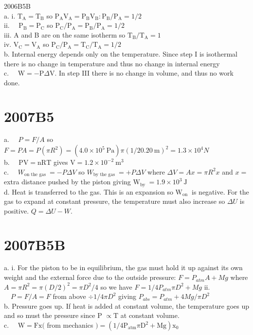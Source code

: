 \begin{enumerate}
2006B5B\\
a. i. $\mathrm{T}_{\mathrm{A}}=\mathrm{T}_{\mathrm{B}}$ so $\mathrm{P}_{\mathrm{A}} \mathrm{V}_{\mathrm{A}}=\mathrm{P}_{\mathrm{B}} \mathrm{V}_{\mathrm{B}}: \mathrm{P}_{\mathrm{B}} / \mathrm{P}_{\mathrm{A}}=1 / 2$\\
ii. $\quad \mathrm{P}_{\mathrm{B}}=\mathrm{P}_{\mathrm{C}}$ so $\mathrm{P}_{\mathrm{C}} / \mathrm{P}_{\mathrm{A}}=\mathrm{P}_{\mathrm{B}} / \mathrm{P}_{\mathrm{A}}=1 / 2$\\
iii. A and B are on the same isotherm so $\mathrm{T}_{\mathrm{B}} / \mathrm{T}_{\mathrm{A}}=1$\\
iv. $\mathrm{V}_{\mathrm{C}}=\mathrm{V}_{\mathrm{A}}$ so $\mathrm{P}_{\mathrm{C}} / \mathrm{P}_{\mathrm{A}}=\mathrm{T}_{\mathrm{C}} / \mathrm{T}_{\mathrm{A}}=1 / 2$\\
b. Internal energy depends only on the temperature. Since step I is isothermal there is no change in temperature and thus no change in internal energy\\
c. $\quad \mathrm{W}=-\mathrm{P} \Delta \mathrm{V}$. In step III there is no change in volume, and thus no work done.

\section*{2007B5}
a. $\quad P=F / A$ so $F=P A=P\left(\pi R^{2}\right)=\left(4.0 \times 10^{5} \mathrm{~Pa}\right) \pi(1 / 20.20 \mathrm{~m})^{2}=1.3 \times 10^{4} N$\\
b. $\quad \mathrm{PV}=\mathrm{nRT}$ gives $\mathrm{V}=1.2 \times 10^{-2} \mathrm{~m}^{3}$\\
c. $\quad W_{\text {on the gas }}=-P \Delta V$ so $W_{\text {by the gas }}=+P \Delta V$ where $\Delta V=A x=\pi R^{2} x$ and $x=$ extra distance pushed by the piston giving $\mathrm{W}_{\text {by }}=1.9 \times 10^{3} \mathrm{~J}$\\
d. Heat is transferred to the gas. This is an expansion so $\mathrm{W}_{\text {on }}$ is negative. For the gas to expand at constant pressure, the temperature must also increase so $\Delta U$ is positive. $Q=\Delta U-W$.

\section*{2007B5B}
a. i. For the piston to be in equilibrium, the gas must hold it up against its own weight and the external force due to the outside pressure: $F=P_{a t m} A+M g$ where $A=\pi R^{2}=\pi(D / 2)^{2}=\pi D^{2} / 4$ so we have $F=1 / 4 P_{a t m} \pi D^{2}+M g$ ii. $\quad P=F / A=F$ from above $\div 1 / 4 \pi D^{2}$ giving $P_{a b s}=P_{a t m}+4 M g / \pi D^{2}$\\
b. Pressure goes up. If heat is added at constant volume, the temperature goes up and so must the pressure since P $\propto \mathrm{T}$ at constant volume.\\
c. $\quad \mathrm{W}=\mathrm{Fx}($ from mechanics $)=\left(1 / 4 \mathrm{P}_{\mathrm{atm}} \pi \mathrm{D}^{2}+\mathrm{Mg}\right) \mathrm{x}_{0}$


\end{enumerate}
